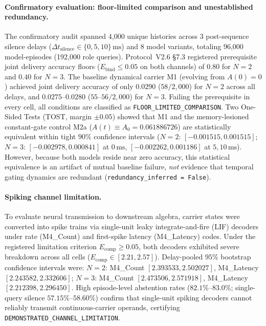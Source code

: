 \paragraph{Confirmatory evaluation: floor-limited comparison and unestablished redundancy.}
The confirmatory audit spanned 4,000 unique histories across 3 post-sequence silence
delays ($\Delta t_{\text{silence}} \in \{0, 5, 10\}\,\text{ms}$) and 8 model variants,
totaling 96,000 model-episodes (192,000 role queries). Protocol~V2.6 \S7.3 registered
prerequisite joint delivery accuracy floors ($E_{\text{bind}} \le 0.05$ on both channels)
of $0.80$ for $N=2$ and $0.40$ for $N=3$. The baseline dynamical carrier M1 (evolving from $A(0)=0$) achieved joint delivery accuracy of only $0.0290$ ($58/2{,}000$) for $N=2$ across all delays, and $0.0275$--$0.0280$ ($55$--$56/2{,}000$) for $N=3$. Failing the prerequisite in every cell, all conditions are classified as \texttt{FLOOR\_LIMITED\_COMPARISON}. Two One-Sided Tests (TOST, margin $\pm 0.05$) showed that M1 and the memory-lesioned constant-gate control M2a ($A(t) \equiv A_0 = 0.061886726$) are statistically equivalent within tight $90\%$ confidence intervals ($N=2$: $[-0.001515, 0.001515]$; $N=3$: $[-0.002978, 0.000841]$ at $0\,\text{ms}$, $[-0.002262, 0.001186]$ at $5, 10\,\text{ms}$). However, because both models reside near zero accuracy, this statistical equivalence is an artifact of mutual baseline failure, \emph{not} evidence that temporal gating dynamics are redundant (\texttt{redundancy\_inferred = False}).

\paragraph{Spiking channel limitation.}
To evaluate neural transmission to downstream algebra, carrier states were converted into spike trains via single-unit leaky integrate-and-fire (LIF) decoders under rate (M4\_Count) and first-spike latency (M4\_Latency) codes. Under the registered limitation criterion $E_{\text{comp}} \ge 0.05$, both decoders exhibited severe breakdown across all cells ($E_{\text{comp}} \in [2.21, 2.57]$). Delay-pooled $95\%$ bootstrap confidence intervals were: $N=2$: M4\_Count $[2.393533, 2.502027]$, M4\_Latency $[2.243582, 2.332606]$; $N=3$: M4\_Count $[2.473506, 2.571918]$, M4\_Latency $[2.212398, 2.296450]$. High episode-level abstention rates ($82.1\%$--$83.0\%$; single-query silence $57.15\%$--$58.60\%$) confirm that single-unit spiking decoders cannot reliably transmit continuous-carrier operands, certifying \texttt{DEMONSTRATED\_CHANNEL\_LIMITATION}.


